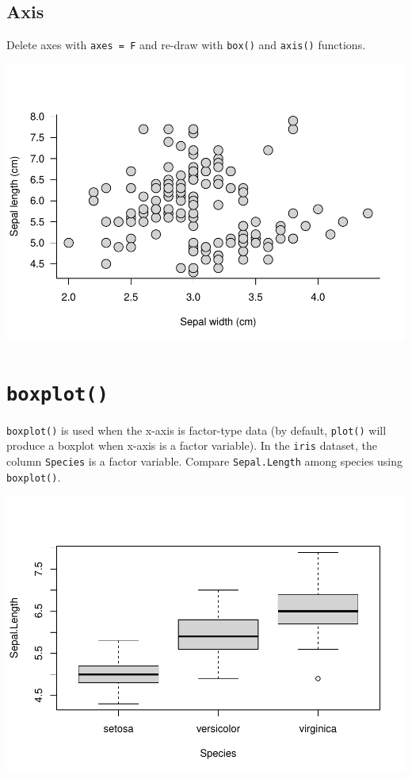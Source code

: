 \documentclass[
]{book}
\begin{document}
\hypertarget{axis}{%
\subsection{Axis}\label{axis}}

Delete axes with \texttt{axes\ =\ F} and re-draw with \texttt{box()} and \texttt{axis()} functions.

\includegraphics{_main_files/figure-latex/unnamed-chunk-29-1.pdf}

\hypertarget{boxplot}{%
\section{\texorpdfstring{\texttt{boxplot()}}{boxplot()}}\label{boxplot}}

\texttt{boxplot()} is used when the x-axis is factor-type data (by default, \texttt{plot()} will produce a boxplot when x-axis is a factor variable). In the \texttt{iris} dataset, the column \texttt{Species} is a factor variable. Compare \texttt{Sepal.Length} among species using \texttt{boxplot()}.

\includegraphics{_main_files/figure-latex/unnamed-chunk-30-1.pdf}
\end{document}
